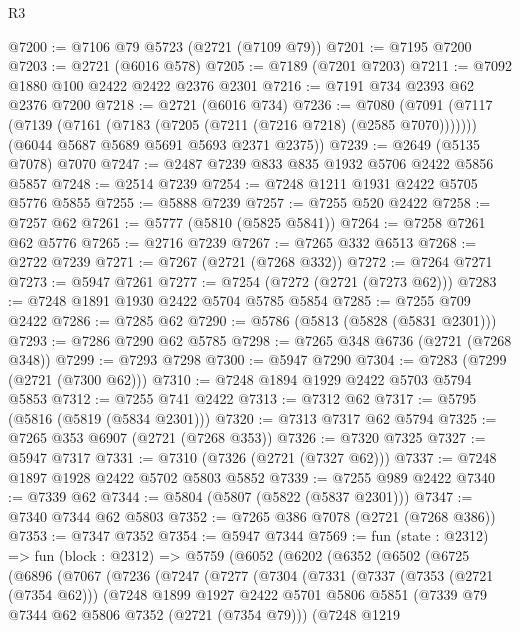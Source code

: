 \begin{lexlean}{R3}
\begin{coremodule}
@7200 := @7106 @79 @5723 (@2721 (@7109 @79))
@7201 := @7195 @7200
@7203 := @2721 (@6016 @578)
@7205 := @7189 (@7201 @7203)
@7211 := @7092 @1880 @100 @2422 @2422 @2376 @2301
@7216 := @7191 @734 @2393 @62 @2376 @7200
@7218 := @2721 (@6016 @734)
@7236 := @7080
    (@7091
      (@7117 (@7139 (@7161 (@7183 (@7205 (@7211 (@7216 @7218) (@2585 @7070)))))))
      (@6044 @5687 @5689 @5691 @5693 @2371 @2375))
@7239 := @2649 (@5135 @7078) @7070
@7247 := @2487 @7239 @833 @835 @1932 @5706 @2422 @5856 @5857
@7248 := @2514 @7239
@7254 := @7248 @1211 @1931 @2422 @5705 @5776 @5855
@7255 := @5888 @7239
@7257 := @7255 @520 @2422
@7258 := @7257 @62
@7261 := @5777 (@5810 (@5825 @5841))
@7264 := @7258 @7261 @62 @5776
@7265 := @2716 @7239
@7267 := @7265 @332 @6513
@7268 := @2722 @7239
@7271 := @7267 (@2721 (@7268 @332))
@7272 := @7264 @7271
@7273 := @5947 @7261
@7277 := @7254 (@7272 (@2721 (@7273 @62)))
@7283 := @7248 @1891 @1930 @2422 @5704 @5785 @5854
@7285 := @7255 @709 @2422
@7286 := @7285 @62
@7290 := @5786 (@5813 (@5828 (@5831 @2301)))
@7293 := @7286 @7290 @62 @5785
@7298 := @7265 @348 @6736 (@2721 (@7268 @348))
@7299 := @7293 @7298
@7300 := @5947 @7290
@7304 := @7283 (@7299 (@2721 (@7300 @62)))
@7310 := @7248 @1894 @1929 @2422 @5703 @5794 @5853
@7312 := @7255 @741 @2422
@7313 := @7312 @62
@7317 := @5795 (@5816 (@5819 (@5834 @2301)))
@7320 := @7313 @7317 @62 @5794
@7325 := @7265 @353 @6907 (@2721 (@7268 @353))
@7326 := @7320 @7325
@7327 := @5947 @7317
@7331 := @7310 (@7326 (@2721 (@7327 @62)))
@7337 := @7248 @1897 @1928 @2422 @5702 @5803 @5852
@7339 := @7255 @989 @2422
@7340 := @7339 @62
@7344 := @5804 (@5807 (@5822 (@5837 @2301)))
@7347 := @7340 @7344 @62 @5803
@7352 := @7265 @386 @7078 (@2721 (@7268 @386))
@7353 := @7347 @7352
@7354 := @5947 @7344
@7569 := fun (state : @2312) =>
  fun (block : @2312) =>
  @5759
    (@6052
      (@6202
        (@6352
          (@6502
            (@6725
              (@6896
                (@7067
                  (@7236
                    (@7247
                      (@7277
                        (@7304
                          (@7331
                            (@7337
                              (@7353 (@2721 (@7354 @62)))
                              (@7248
                                @1899
                                @1927
                                @2422
                                @5701
                                @5806
                                @5851
                                (@7339 @79 @7344 @62 @5806 @7352 (@2721 (@7354 @79)))
                                (@7248
                                  @1219

\end{coremodule}
\end{lexlean}
